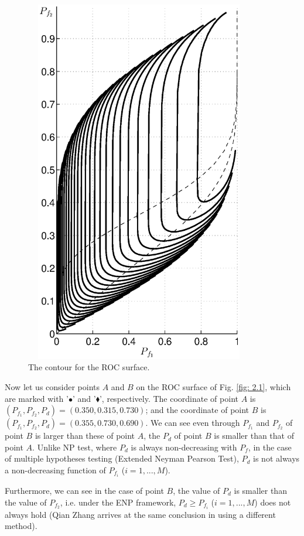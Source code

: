 \begin{figure}[!t]
\centering
\includegraphics[width = 10cm, height=16cm]{2/ex3.eps}
\caption{The contour for the ROC surface.}
\label{fig: 2.3mar9}
\end{figure}

Now let us consider points $A$ and $B$ on the ROC surface of Fig. \ref{fig: 2.1}, which are marked with '$\bullet$' and '$\blacklozenge$', respectively.  The coordinate of point $A$ is $(P_{f_1}, P_{f_2}, P_d) = (0.350, 0.315, 0.730)$; and the coordinate of point $B$ is  $(P_{f_1}, P_{f_2}, P_d) = (0.355, 0.730, 0.690)$. We can see even through $P_{f_1}$ and $P_{f_2}$ of point $B$ is larger than these of point $A$, the $P_d$ of point $B$ is  smaller than that of point $A$.  
Unlike NP test, where $P_d$ is always non-decreasing with $P_f$, in the case of multiple hypotheses testing (Extended Neyman Pearson Test), $P_d$ is not always a non-decreasing function of  $P_{f_i}$ ($i=1, ..., M$).

Furthermore, we can see in the case of point $B$, the value of $P_d$ is smaller than the value of $P_{f_2}$, i.e. under the ENP framework, $P_d \geq P_{f_i}$  ($i = 1, ..., M$) does not always hold (Qian Zhang arrives at the same conclusion in  \cite{zhang1999design, zhang2000efficient} using a different method). 

